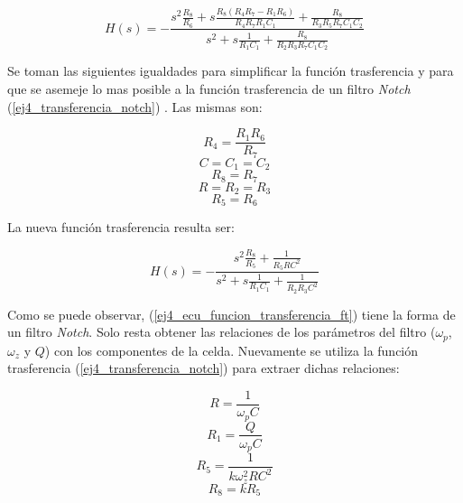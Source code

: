 \begin{equation} H(s) = - \frac{s^2 \frac{R_8}{R_6} + s \frac{R_8 (R_4 R_7 - R_1 R_6 )}{R_4 R_7 R_1 C_1} + \frac{R_8}{R_3 R_5 R_7 C_1 C_2}}{s^2 + s\frac{1}{R_1 C_1} + \frac{R_8}{R_2 R_3 R_7 C_1 C_2}} \label{ej4_ecu_funcion_transferencia_ft_completa}\end{equation} 

Se toman las siguientes igualdades para simplificar la función trasferencia y para que se asemeje lo mas posible a la función trasferencia de un filtro \textit{Notch} (\ref{ej4_transferencia_notch}) . Las mismas son:

\begin{displaymath}  R_4 = \frac{R_1 R_6}{R_7} \end{displaymath} 
\begin{displaymath}  C = C_1 = C_2  \end{displaymath} 
\begin{displaymath}  R_8 = R_7  \end{displaymath} 
\begin{displaymath}  R = R_2 = R_3  \end{displaymath} 
\begin{displaymath}  R_5 = R_6  \end{displaymath} 

La nueva función trasferencia resulta ser:

\begin{equation} H(s) = - \frac{s^2 \frac{R_8}{R_5} + \frac{1}{R_5 R C^2}}{s^2 + s\frac{1}{R_1 C_1} + \frac{1}{R_2 R_3 C^2}} \label{ej4_ecu_funcion_transferencia_ft}\end{equation}

Como se puede observar, (\ref{ej4_ecu_funcion_transferencia_ft}) tiene la forma de un filtro \textit{Notch}. Solo resta obtener las relaciones de los parámetros del filtro ($\omega_p$, $\omega_z$ y $Q$) con los componentes de la celda. Nuevamente se utiliza la función trasferencia (\ref{ej4_transferencia_notch}) para extraer dichas relaciones:

\begin{displaymath}  R = \frac{1}{\omega_p C}  \end{displaymath} 
\begin{displaymath}  R_1 = \frac{Q}{\omega_p C}  \end{displaymath} 
\begin{displaymath}  R_5 = \frac{1}{k \omega^2_z R C^2}  \end{displaymath} 
\begin{displaymath}  R_8 = k R_5 \end{displaymath} 

